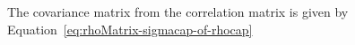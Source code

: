 \noindent The covariance matrix
from the correlation matrix
is given by
Equation~\eqref{eq:rhoMatrix-sigmacap-of-rhocap}

